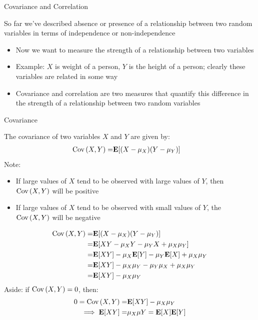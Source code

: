 \documentclass[compress, 8pt]{beamer}
\begin{document}
\begin{frame}{Covariance and Correlation}

So far we've described absence or presence of a relationship between two random variables in terms of independence or non-independence
\begin{itemize}
    \item Now we want to measure the strength of a relationship between two variables
    \item Example: $X$ is weight of a person, $Y$ is the height of a person; clearly these variables are related in some way
    \item Covariance and correlation are two measures that quantify this difference in the strength of a relationship between two random variables
\end{itemize}


\end{frame}

\begin{frame}{Covariance}

The covariance of two variables $X$ and $Y$ are given by:
\begin{align*}
    \text{Cov} \left( X, Y \right) =& \mathbf{E} [(X - \mu_X)(Y - \mu_Y)]
\end{align*}
Note:
\begin{itemize}
    \item If large values of $X$ tend to be observed with large values of $Y$, then $\text{Cov} \left( X, Y \right)$ will be positive
    \item If large values of $X$ tend to be observed with small values of $Y$, the $\text{Cov} \left( X, Y \right)$ will be negative
\end{itemize}

\begin{align*}
    \text{Cov} \left( X, Y \right) =& \mathbf{E} [(X - \mu_X)(Y - \mu_Y)] \\
    =& \mathbf{E} [XY - \mu_X Y - \mu_Y X + \mu_X \mu_Y ] \\
    =& \mathbf{E} [XY] - \mu_X \mathbf{E} [Y] - \mu_Y \mathbf{E} [X] + \mu_X \mu_Y \\
    =& \mathbf{E} [XY] - \mu_X \mu_Y - \mu_Y \mu_X + \mu_X \mu_Y \\
    =& \mathbf{E} [XY] - \mu_X \mu_Y
\end{align*}
Aside: if $\text{Cov} \left( X, Y \right) = 0$, then:
\begin{align*}
    0 = \text{Cov} \left( X, Y \right) =& \mathbf{E} [XY] - \mu_X \mu_Y \\
    \implies \mathbf{E} [XY] =& \mu_X \mu Y = \mathbf{E} [X] \mathbf{E}[Y]
\end{align*}

\end{frame}
\end{document}
